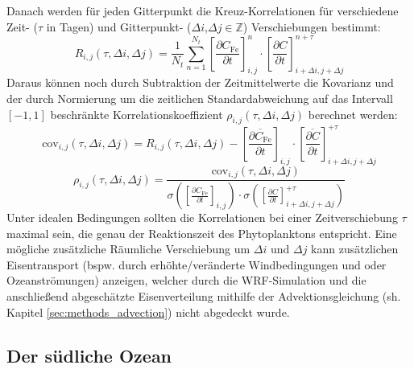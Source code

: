 \documentclass[12pt,a4paper,onecolumn,draft]{scrartcl}
\begin{document}
Danach werden für jeden Gitterpunkt die Kreuz-Korrelationen für verschiedene Zeit- ($\tau$ in Tagen) und Gitterpunkt- ($\Delta i$,$\Delta j \in \mathbb{Z}$) Verschiebungen bestimmt:
\begin{equation}
R_{i,j}(\tau,\Delta i, \Delta j)= \frac{1}{N_t}\sum\limits_{n=1}^{N_t} \left[\frac{\partial C_\text{Fe}}{\partial t}\right]_{i,j}^n \cdot \left[\frac{\partial C}{\partial t}\right]_{i+\Delta i ,j+\Delta j}^{n+\tau}
\end{equation}
Daraus können noch durch Subtraktion der Zeitmittelwerte die Kovarianz und der durch Normierung um die zeitlichen Standardabweichung auf das Intervall $[-1,1]$ beschränkte Korrelationskoeffizient $\rho_{i,j}(\tau,\Delta i, \Delta j)$ berechnet werden:
\begin{equation}
\text{cov}_{i,j}(\tau,\Delta i, \Delta j) = R_{i,j}(\tau,\Delta i, \Delta j)-\left[\frac{\overline{\partial C_\text{Fe}}}{\partial t}\right]_{i,j} \cdot \left[\frac{\overline{\partial C}}{\partial t}\right]_{i+\Delta i,j+\Delta j}^{+\tau}
\end{equation}
\begin{equation}
\rho_{i,j}(\tau,\Delta i, \Delta j) = \frac{\text{cov}_{i,j}(\tau,\Delta i, \Delta j)}{\sigma \left(\left[\frac{\partial C_\text{Fe}}{\partial t}\right]_{i,j}\right) \cdot \sigma\left(\left[\frac{\partial C}{\partial t}\right]_{i+\Delta i ,j+\Delta j}^{+\tau}\right)}
\end{equation}
Unter idealen Bedingungen sollten die Korrelationen bei einer Zeitverschiebung $\tau$ maximal sein, die genau der Reaktionszeit des Phytoplanktons entspricht. Eine mögliche zusätzliche Räumliche Verschiebung um $\Delta i$ und $\Delta j$ kann zusätzlichen Eisentransport (bspw. durch erhöhte/veränderte Windbedingungen und oder Ozeanströmungen) anzeigen, welcher durch die WRF-Simulation und die anschließend abgeschätzte Eisenverteilung mithilfe der Advektionsgleichung (sh. Kapitel \ref{sec:methods_advection}) nicht abgedeckt wurde.  

\subsection{Der südliche Ozean}
\end{document}
